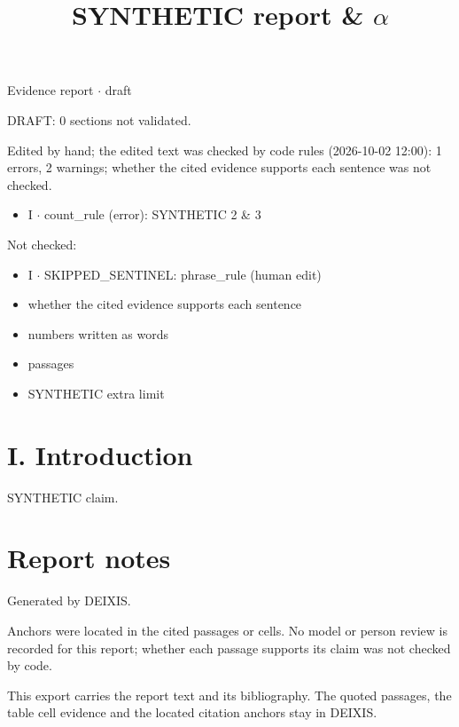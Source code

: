 \documentclass[journal]{IEEEtran}
\begin{document}
\title{SYNTHETIC report \& \ensuremath{\alpha}}

\maketitle

\noindent Evidence report \ensuremath{\cdot} draft

\noindent DRAFT: 0 sections not validated.

\noindent Edited by hand; the edited text was checked by code rules (2026-10-02 12:00): 1 errors, 2 warnings; whether the cited evidence supports each sentence was not checked.

\begin{itemize}
\item I \ensuremath{\cdot} count\_rule (error): SYNTHETIC 2 \& 3
\end{itemize}

\noindent Not checked:

\begin{itemize}
\item I \ensuremath{\cdot} SKIPPED\_SENTINEL: phrase\_rule (human edit)
\item whether the cited evidence supports each sentence
\item numbers written as words
\item passages
\item SYNTHETIC extra limit
\end{itemize}

\section*{I. Introduction}

SYNTHETIC claim. \cite{Synth26}

\section*{Report notes}

Generated by DEIXIS.

Anchors were located in the cited passages or cells. No model or person review is recorded for this report; whether each passage supports its claim was not checked by code.

This export carries the report text and its bibliography. The quoted passages, the table cell evidence and the located citation anchors stay in DEIXIS.




\end{document}
